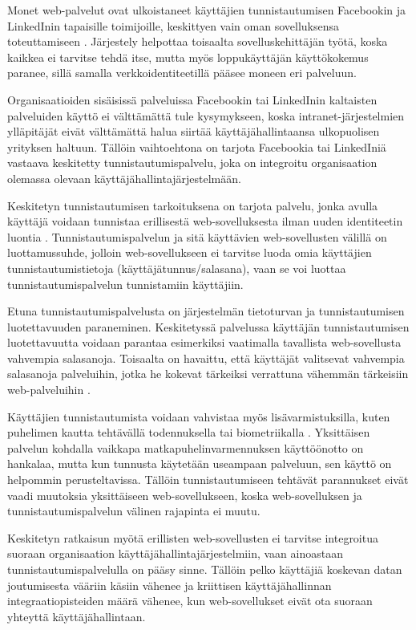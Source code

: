 Monet web-palvelut ovat ulkoistaneet käyttäjien tunnistautumisen Facebookin ja LinkedInin tapaisille toimijoille, keskittyen vain oman sovelluksensa toteuttamiseen \cite{facebook}. Järjestely helpottaa toisaalta sovelluskehittäjän työtä, koska kaikkea ei tarvitse tehdä itse, mutta myös loppukäyttäjän käyttökokemus paranee, sillä samalla verkkoidentiteetillä pääsee moneen eri palveluun.

Organisaatioiden sisäisissä palveluissa Facebookin tai LinkedInin kaltaisten palveluiden käyttö ei välttämättä tule kysymykseen, koska intranet-järjestelmien ylläpitäjät eivät välttämättä halua siirtää käyttäjähallintaansa ulkopuolisen yrityksen haltuun. Tällöin vaihtoehtona on tarjota Facebookia tai LinkedIniä vastaava keskitetty tunnistautumispalvelu, joka on integroitu organisaation olemassa olevaan käyttäjähallintajärjestelmään.

Keskitetyn tunnistautumisen tarkoituksena on tarjota palvelu, jonka avulla käyttäjä voidaan tunnistaa erillisestä web-sovelluksesta ilman uuden identiteetin luontia \cite{facebook}. Tunnistautumispalvelun ja sitä käyttävien web-sovellusten välillä on luottamussuhde, jolloin web-sovellukseen ei tarvitse luoda omia käyttäjien tunnistautumistietoja (käyttäjätunnus/salasana), vaan se voi luottaa tunnistautumispalvelun tunnistamiin käyttäjiin.

Etuna tunnistautumispalvelusta on järjestelmän tietoturvan ja tunnistautumisen luotettavuuden paraneminen. Keskitetyssä palvelussa käyttäjän tunnistautumisen luotettavuutta voidaan parantaa esimerkiksi vaatimalla tavallista web-sovellusta vahvempia salasanoja. Toisaalta on havaittu, että käyttäjät valitsevat vahvempia salasanoja palveluihin, jotka he kokevat tärkeiksi verrattuna vähemmän tärkeisiin web-palveluihin \cite{password_habits}.

Käyttäjien tunnistautumista voidaan vahvistaa myös lisävarmistuksilla, kuten puhelimen kautta tehtävällä todennuksella tai biometriikalla \cite{nisti}. Yksittäisen palvelun kohdalla vaikkapa matkapuhelinvarmennuksen käyttöönotto on hankalaa, mutta kun tunnusta käytetään useampaan palveluun, sen käyttö on helpommin perusteltavissa. Tällöin tunnistautumiseen tehtävät parannukset eivät vaadi muutoksia yksittäiseen web-sovellukseen, koska web-sovelluksen ja tunnistautumispalvelun välinen rajapinta ei muutu.

Keskitetyn ratkaisun myötä erillisten web-sovellusten ei tarvitse integroitua suoraan organisaation käyttäjähallintajärjestelmiin, vaan ainoastaan tunnistautumispalvelulla on pääsy sinne. Tällöin pelko käyttäjiä koskevan datan joutumisesta vääriin käsiin vähenee ja kriittisen käyttäjähallinnan integraatiopisteiden määrä vähenee, kun web-sovellukset eivät ota suoraan yhteyttä käyttäjähallintaan.

